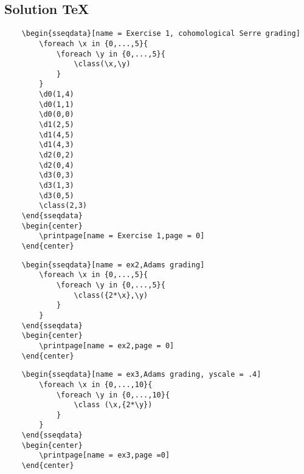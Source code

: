 \subsection{Solution \TeX}
\begin{tcolorbox}[title=Exercise 13,colback=black!80!white,coltext=white]
\begin{verbatim}
    \begin{sseqdata}[name = Exercise 1, cohomological Serre grading]
        \foreach \x in {0,...,5}{
            \foreach \y in {0,...,5}{
                \class(\x,\y)
            }
        }
        \d0(1,4)
        \d0(1,1)
        \d0(0,0)
        \d1(2,5)
        \d1(4,5)
        \d1(4,3)
        \d2(0,2)
        \d2(0,4)
        \d3(0,3)
        \d3(1,3)
        \d3(0,5)
        \class(2,3)
    \end{sseqdata}
    \begin{center}
        \printpage[name = Exercise 1,page = 0]
    \end{center}
\end{verbatim}
\end{tcolorbox}

\begin{tcolorbox}[title=Exercise 14,colback=black!80!white,coltext=white]
\begin{verbatim}
    \begin{sseqdata}[name = ex2,Adams grading]
        \foreach \x in {0,...,5}{
            \foreach \y in {0,...,5}{
                \class({2*\x},\y)
            }
        }
    \end{sseqdata}
    \begin{center}
        \printpage[name = ex2,page = 0]
    \end{center}
\end{verbatim}
\end{tcolorbox}

\begin{tcolorbox}[title=Exercise 15,colback=black!80!white,coltext=white]
\begin{verbatim}
    \begin{sseqdata}[name = ex3,Adams grading, yscale = .4]
        \foreach \x in {0,...,10}{
            \foreach \y in {0,...,10}{
                \class (\x,{2*\y})
            }
        }
    \end{sseqdata}
    \begin{center}
        \printpage[name = ex3,page =0]
    \end{center}
\end{verbatim}
\end{tcolorbox}

